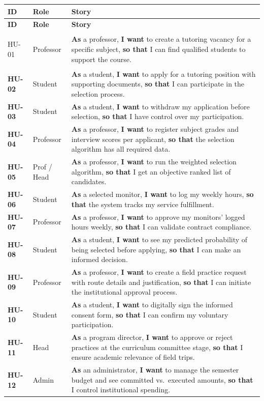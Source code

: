\documentclass[12pt,a4paper]{article}
\begin{document}
\begin{longtable}{>{\bfseries}p{1.2cm} p{2.5cm} p{9.3cm}}
  \toprule
  \textbf{ID} & \textbf{Role} & \textbf{Story} \\
  \midrule
  \endfirsthead
  \toprule \textbf{ID} & \textbf{Role} & \textbf{Story} \\ \midrule \endhead

  HU-01 & Professor & \textbf{As} a professor, \textbf{I want} to create a tutoring vacancy for a specific subject, \textbf{so that} I can find qualified students to support the course. \\[4pt]
  HU-02 & Student & \textbf{As} a student, \textbf{I want} to apply for a tutoring position with supporting documents, \textbf{so that} I can participate in the selection process. \\[4pt]
  HU-03 & Student & \textbf{As} a student, \textbf{I want} to withdraw my application before selection, \textbf{so that} I have control over my participation. \\[4pt]
  HU-04 & Professor & \textbf{As} a professor, \textbf{I want} to register subject grades and interview scores per applicant, \textbf{so that} the selection algorithm has all required data. \\[4pt]
  HU-05 & Prof / Head & \textbf{As} a professor, \textbf{I want} to run the weighted selection algorithm, \textbf{so that} I get an objective ranked list of candidates. \\[4pt]
  HU-06 & Student & \textbf{As} a selected monitor, \textbf{I want} to log my weekly hours, \textbf{so that} the system tracks my service fulfillment. \\[4pt]
  HU-07 & Professor & \textbf{As} a professor, \textbf{I want} to approve my monitors' logged hours weekly, \textbf{so that} I can validate contract compliance. \\[4pt]
  HU-08 & Student & \textbf{As} a student, \textbf{I want} to see my predicted probability of being selected before applying, \textbf{so that} I can make an informed decision. \\[4pt]
  HU-09 & Professor & \textbf{As} a professor, \textbf{I want} to create a field practice request with route details and justification, \textbf{so that} I can initiate the institutional approval process. \\[4pt]
  HU-10 & Student & \textbf{As} a student, \textbf{I want} to digitally sign the informed consent form, \textbf{so that} I can confirm my voluntary participation. \\[4pt]
  HU-11 & Head & \textbf{As} a program director, \textbf{I want} to approve or reject practices at the curriculum committee stage, \textbf{so that} I ensure academic relevance of field trips. \\[4pt]
  HU-12 & Admin & \textbf{As} an administrator, \textbf{I want} to manage the semester budget and see committed vs.\ executed amounts, \textbf{so that} I control institutional spending. \\[4pt]
  \bottomrule
\end{longtable}
\end{document}
